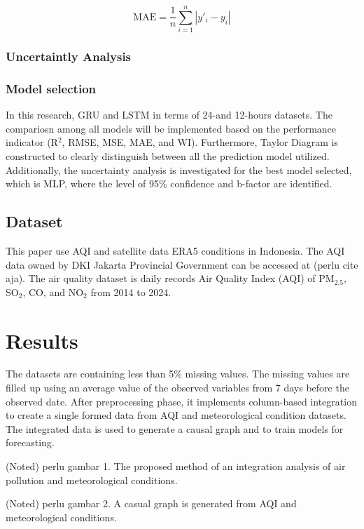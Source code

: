 \documentclass[pdflatex,sn-mathphys-num]{sn-jnl}%
\theoremstyle{thmstyleone}%
\theoremstyle{thmstyletwo}%
\theoremstyle{thmstylethree}%
\begin{document}
\begin{equation}
\mathrm{MAE} = \frac{1}{n} \sum_{i=1}^{n} \left| y'_i - y_i \right|
\tag{14}
\end{equation}

\subsubsection{Uncertaintly Analysis}

\subsubsection{Model selection}
In this research, GRU and LSTM in terms of 24-and 12-hours datasets. The compariosn among all models will be implemented based on the performance indicator (R$^{2}$, RMSE, MSE, MAE, and WI). Furthermore, Taylor Diagram is constructed to clearly distinguish between all the prediction model utilized. Additionally, the uncertainty analysis is investigated for the best model selected, which is MLP, where the level of 95\% confidence and b-factor are identified.

\subsection{Dataset}
This paper use AQI and satellite data ERA5 conditions in Indonesia. The AQI data owned by DKI Jakarta Provincial Government can be accessed at (perlu cite aja). The air quality dataset is daily records Air Quality Index (AQI) of  PM$_{2.5}$, SO$_{2}$, CO, and NO$_{2}$ from 2014 to 2024.

\section*{Results}
The datasets are containing less than 5\% missing values. The missing values are filled up using an average value of the observed variables from 7 days before the observed date. After preprocessing phase, it implements column-based integration to create a single formed data from AQI and meteorological condition datasets. The integrated data is used to generate a causal graph and to train models for forecasting.

(Noted) perlu gambar 1. The proposed method of an integration analysis of air pollution and meteorological conditions.

(Noted) perlu gambar 2. A casual graph is generated from AQI and meteorological conditions.
\end{document}
